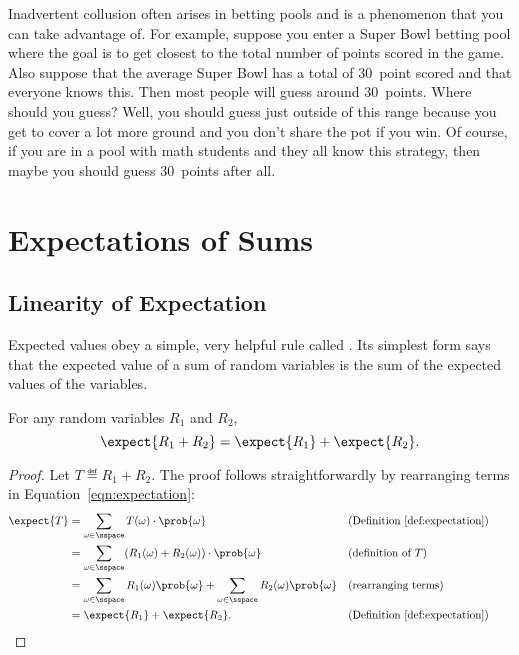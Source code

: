 Inadvertent collusion often arises in betting pools and is a
phenomenon that you can take advantage of.  For example, suppose you
enter a Super Bowl betting pool where the goal is to get closest to
the total number of points scored in the game.  Also suppose that the
average Super Bowl has a total of 30~point scored and that everyone
knows this.  Then most people will guess around 30~points.  Where
should you guess?  Well, you should guess just outside of this range
because you get to cover a lot more ground and you don't share the pot
if you win.  Of course, if you are in a pool with math students and
they all know this strategy, then maybe you should guess 30~points
after all.


\section{Expectations of Sums}

\subsection{Linearity of Expectation}\label{finlin}

Expected values obey a simple, very helpful rule called
.  Its simplest form says that the
expected value of a sum of random variables is the sum of the expected
values of the variables.

\begin{theorem}\label{expsum-2}
For any random variables $R_1$ and $R_2$,
\[
\expect{R_1 + R_2} = \expect{R_1} + \expect{R_2}.
\]
\end{theorem}

\begin{proof}
Let $T \eqdef R_1+R_2$.  The proof follows straightforwardly by
rearranging terms in Equation~\eqref{eqn:expectation}:
\begin{align*}
\expect{T}
    & = \sum_{\omega \in \sspace} T(\omega) \cdot \prob{\omega}
        && \text{(Definition~\ref{def:expectation})}\\
        & = \sum_{\omega \in \sspace} (R_1(\omega) + R_2(\omega)) \cdot \prob{\omega}
        && \text{(definition of $T$)}\\
        & = \sum_{\omega \in \sspace} R_1(\omega) \prob{\omega} +
              \sum_{\omega \in \sspace} R_2(\omega) \prob{\omega}
        && \text{(rearranging terms)}\\
        & = \expect{R_1} + \expect{R_2}.   
        && \text{(Definition~\ref{def:expectation})} && \qedhere
\end{align*}
\end{proof}

